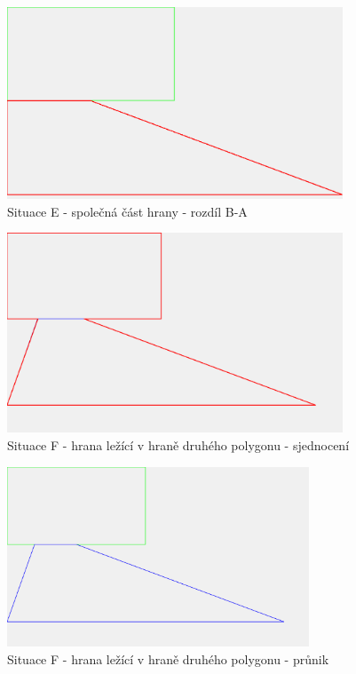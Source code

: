 \documentclass[a4paper,11pt,twoside]{article}
\begin{document}
\vspace{0.2cm}
\begin{figure}[hbt!] 
\begin{center}
\includegraphics[width=10cm]{pictures/E_diffBA.png} 
\caption[Situace E - společná část hrany - rozdíl B-A]{Situace E - společná část hrany - rozdíl B-A}
\label{fig:E_diffBA}
\end{center}
\end{figure}

\vspace{0.2cm}
\begin{figure}[hbt!] 
\begin{center}
\includegraphics[width=10cm]{pictures/F_union_v2.png} 
\caption[Situace F - hrana ležící v hraně druhého polygonu - sjednocení]{Situace F - hrana ležící v hraně druhého polygonu - sjednocení}
\label{fig:F_union}
\end{center}
\end{figure}

\vspace{0.2cm}
\begin{figure}[hbt!] 
\begin{center}
\includegraphics[width=9cm]{pictures/F_intersect_v2.png} 
\caption[Situace F - hrana ležící v hraně druhého polygonu - průnik]{Situace F - hrana ležící v hraně druhého polygonu - průnik}
\label{fig:F_intersect}
\end{center}
\end{figure}
\end{document}

